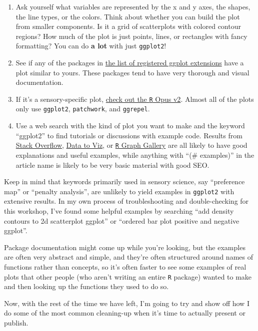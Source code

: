 \documentclass[
]{book}
\providecommand{\tightlist}{%
  \setlength{\itemsep}{0pt}\setlength{\parskip}{0pt}}
\begin{document}
\begin{enumerate}
\def\labelenumi{\arabic{enumi}.}
\tightlist
\item
  Ask yourself what variables are represented by the x and y axes, the shapes, the line types, or the colors. Think about whether you can build the plot from smaller components. Is it a grid of scatterplots with colored contour regions? How much of the plot is just points, lines, or rectangles with fancy formatting? You can do \textbf{a lot} with just \texttt{ggplot2}!
\item
  See if any of the packages in \href{https://exts.ggplot2.tidyverse.org/gallery/}{the list of registered ggplot extensions} have a plot similar to yours. These packages tend to have very thorough and visual documentation.
\item
  If it's a sensory-specific plot, \href{https://jlahne.github.io/r-opus-v2/index.html}{check out the \texttt{R} Opus v2}. Almost all of the plots only use \texttt{ggplot2}, \texttt{patchwork}, and \texttt{ggrepel}.
\item
  Use a web search with the kind of plot you want to make and the keyword ``ggplot2'' to find tutorials or discussions with example code. Results from \href{https://stackoverflow.com/questions/tagged/ggplot2}{Stack Overflow}, \href{https://www.data-to-viz.com/}{Data to Viz}, or \href{https://r-graph-gallery.com/index.html}{\texttt{R} Graph Gallery} are all likely to have good explanations and useful examples, while anything with ``(\# examples)'' in the article name is likely to be very basic material with good SEO.
\end{enumerate}

Keep in mind that keywords primarily used in sensory science, say ``preference map'' or ``penalty analysis'', are unlikely to yield examples in \texttt{ggplot2} with extensive results. In my own process of troubleshooting and double-checking for this workshop, I've found some helpful examples by searching ``add density contours to 2d scatterplot ggplot'' or ``ordered bar plot positive and negative ggplot''.

Package documentation might come up while you're looking, but the examples are often very abstract and simple, and they're often structured around names of functions rather than concepts, so it's often faster to see some examples of real plots that other people (who aren't writing an entire \texttt{R} package) wanted to make and then looking up the functions they used to do so.

Now, with the rest of the time we have left, I'm going to try and show off how I do some of the most common cleaning-up when it's time to actually present or publish.
\end{document}
